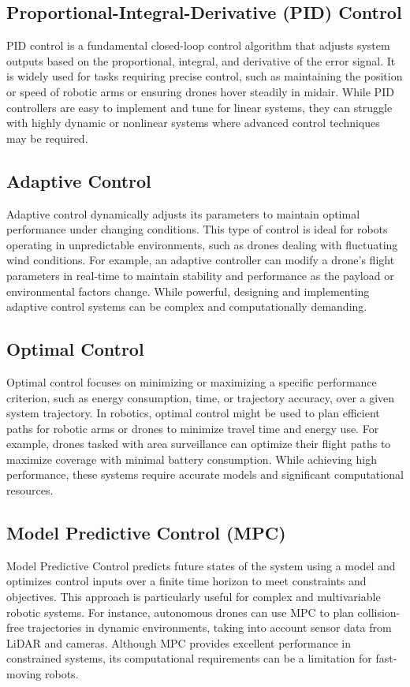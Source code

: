 \subsection{Proportional-Integral-Derivative (PID) Control}
PID control is a fundamental closed-loop control algorithm that adjusts system outputs based on the proportional, integral, and derivative of the error signal. It is widely used for tasks requiring precise control, such as maintaining the position or speed of robotic arms or ensuring drones hover steadily in midair. While PID controllers are easy to implement and tune for linear systems, they can struggle with highly dynamic or nonlinear systems where advanced control techniques may be required.

\subsection{Adaptive Control}
Adaptive control dynamically adjusts its parameters to maintain optimal performance under changing conditions. This type of control is ideal for robots operating in unpredictable environments, such as drones dealing with fluctuating wind conditions. For example, an adaptive controller can modify a drone's flight parameters in real-time to maintain stability and performance as the payload or environmental factors change. While powerful, designing and implementing adaptive control systems can be complex and computationally demanding.

\subsection{Optimal Control}
Optimal control focuses on minimizing or maximizing a specific performance criterion, such as energy consumption, time, or trajectory accuracy, over a given system trajectory. In robotics, optimal control might be used to plan efficient paths for robotic arms or drones to minimize travel time and energy use. For example, drones tasked with area surveillance can optimize their flight paths to maximize coverage with minimal battery consumption. While achieving high performance, these systems require accurate models and significant computational resources.

\subsection{Model Predictive Control (MPC)}
Model Predictive Control predicts future states of the system using a model and optimizes control inputs over a finite time horizon to meet constraints and objectives. This approach is particularly useful for complex and multivariable robotic systems. For instance, autonomous drones can use MPC to plan collision-free trajectories in dynamic environments, taking into account sensor data from LiDAR and cameras. Although MPC provides excellent performance in constrained systems, its computational requirements can be a limitation for fast-moving robots.

